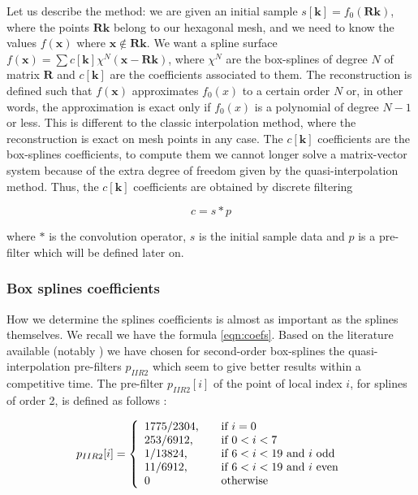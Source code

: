 \documentclass[proc]{edpsmath}
\begin{document}
Let us describe the method: we are given an initial sample $s[\mathbf{k}] = f_0(\mathbf{R} \mathbf{k})$, where the points $\mathbf{R} \mathbf{k}$ belong to our hexagonal mesh, and we need to know the values $f(\mathbf{x})$ where $\mathbf{x} \notin \mathbf{R} \mathbf{k}$. We want a spline surface $f(\mathbf{x}) = \sum c[\mathbf{k}] \chi^N(\mathbf{x} - \mathbf{R}\mathbf{k})$, where $\chi^N$ are the box-splines of degree $N$ of matrix $\mathbf{R}$ and $c[\mathbf{k}]$ are the coefficients associated to them. The reconstruction is defined such that $f(\mathbf{x})$ approximates $f_0(x)$ to a certain order $N$ or, in other words, the approximation is exact only if $f_0(x)$ is a polynomial of degree $N-1$ or less. This is different to the classic interpolation method, where the reconstruction is exact on mesh points in any case. The $c[\mathbf{k}]$ coefficients are the box-splines coefficients, to compute them we cannot longer solve a matrix-vector system because of the extra degree of freedom given by the quasi-interpolation method. Thus, the  $c[\mathbf{k}]$ coefficients are obtained by discrete filtering\cite{Condat2006a}

\begin{equation}
\label{eqn:coefs}
 c = s * p
\end{equation}

where $*$ is the convolution operator, $s$ is the initial sample data and $p$ is a pre-filter which will be defined later on.


\subsubsection{Box splines coefficients}

How we determine the splines coefficients is almost as important as the splines themselves. We recall we have the formula \eqref{eqn:coefs}. Based on the literature available (notably \cite{Condat2007}) we have chosen for second-order box-splines the quasi-interpolation pre-filters $p_{IIR2}$ which seem to give better results within a competitive time. The pre-filter $p_{IIR2}[i]$ of the point of local index $i$, for splines of order 2, is defined as follows : 


\begin{equation}
\label{eqn:filterIIR2}
p_{IIR2} [i] = \left\{
  \begin{array}{l l}
    1775/2304\text{,} & \quad \text{if } i = 0\\
    253/6912\text{,} & \quad \text{if } 0<i<7\\
    1/13824\text{,} & \quad \text{if } 6<i<19 \text{ and $i$ odd}\\
    11/6912\text{,} & \quad \text{if } 6<i<19 \text{ and $i$ even}\\
    0 & \quad \text{otherwise}
  \end{array} \right.
\end{equation}
\end{document}
